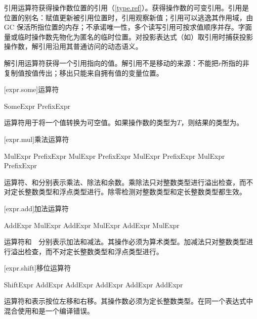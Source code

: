 \pnum
引用运算符\tcode{\&}获得操作数位置的引用（\ref{type.ref}）。获得操作数的可变引用。引用是位置的别名：赋值更新被引用位置时，引用观察新值；引用可以逃逸其作用域，由 GC 保活所指位置的内存；不承诺唯一性，多个读写引用可按求值顺序并存。字面量或临时操作数先物化为匿名的临时位置。对投影表达式（如）取引用时捕获投影操作数，解引用沿用其普通访问的动态语义。

\pnum
解引用运算符\tcode{*}获得一个引用指向的值。解引用不是移动的来源：不能把$r$所指的非复制值按值传出；移出只能来自拥有值的变量位置。

[expr.some]{运算符}

\begin{bnf}{SomeExpr}
     PrefixExpr
\end{bnf}

\pnum
{}运算符用于将一个值转换为可空值。如果操作数的类型为$T$，则结果的类型为。

[expr.mul]{乘法运算符}

\begin{bnf}{MulExpr}
    PrefixExpr \br
    MulExpr \terminal{*} PrefixExpr \br
    MulExpr \terminal{/} PrefixExpr \br
    MulExpr \terminal{\%} PrefixExpr
\end{bnf}

\pnum
运算符\tcode{*}、\tcode{/}和\tcode{\%}分别表示乘法、除法和余数。乘除法只对整数类型进行溢出检查，而不对定长整数类型和浮点类型进行。除零检测对整数类型和定长整数类型都生效。

[expr.add]{加法运算符}

\begin{bnf}{AddExpr}
    MulExpr \br
    AddExpr \terminal{+} MulExpr \br
    AddExpr \terminal{-} MulExpr
\end{bnf}

\pnum
运算符\tcode{+}和\ \tcode{-}\ 分别表示加法和减法。其操作必须为算术类型。加减法只对整数类型进行溢出检查，而不对定长整数类型和浮点类型进行。

[expr.shift]{移位运算符}

\begin{bnf}{ShiftExpr}
    AddExpr \br
    AddExpr  AddExpr \br
    AddExpr  AddExpr
\end{bnf}

\pnum
运算符和表示按位左移和右移。其操作数必须为定长整数类型。在同一个表达式中混合使用和是一个编译错误。

